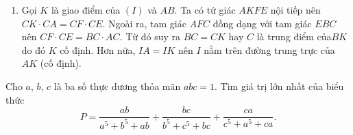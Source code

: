 \begin{ex}
{\begin{enumerate}
		Xét tam giác $CDN$. Ta có: $\angle{CDF}=\angle{CAF}=\angle{BAN}=\angle{BDN}$ (tứ giác $ADFC$ và $ADNB$ nội tiếp). Suy ra $DF$ là phân giác của góc $CDN$. Tương tự, ta cũng có $NF$ là phân giác góc $CND$ hay $F$ chính là tâm đường tròn nội tiếp tam giác $CDN$.
		\item Gọi $K$ là giao điểm của $(I)$ và $AB$. Ta có tứ giác $AKFE$ nội tiếp nên $CK\cdot CA=CF\cdot CE$. Ngoài ra, tam giác $AFC$ đồng dạng với tam giác $EBC$ nên $CF\cdot CE=BC\cdot AC$. Từ đó suy ra $BC=CK$ hay $C$ là trung điểm của$BK$ do đó $K$ cố định. Hơn nữa, $IA=IK$ nên $I$ nằm trên đường trung trực của $AK$ (cố định).
	\end{enumerate}
}
\end{ex}
\begin{ex}%
    Cho $a$, $b$, $c$ là ba số thực dương thỏa mãn $abc = 1$. Tìm giá trị lớn nhất của biểu thức $$P=\dfrac{ab}{a^5+b^5+ab}+\dfrac{bc}{b^5+c^5+bc}+\dfrac{ca}{c^5+a^5+ca}.$$
\end{ex}


